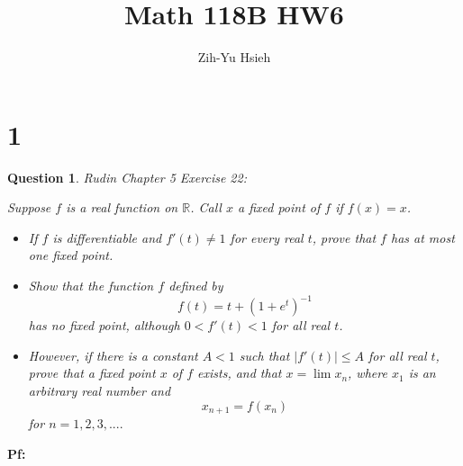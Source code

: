 \documentclass{article}
\title{Math 118B HW6}
\author{Zih-Yu Hsieh}
\newtheorem{question}{Question}
\begin{document}
\maketitle

\section*{1}
\begin{myBox}[]{}
    \begin{question}
        Rudin Chapter 5 Exercise 22:

        Suppose $f$ is a real function on $\mathbb{R}$. Call $x$ a \textit{fixed point} of $f$ if $f(x)=x$.
        \begin{itemize}
            \item[(a)] If $f$ is differentiable and $f'(t)\neq 1$ for every real $t$, prove that $f$ has at most one fixed point.
            \item[(b)] Show that the function $f$ defined by 
            $$f(t)=t+(1+e^t)^{-1}$$
            has no fixed point, although $0<f'(t)<1$ for all real $t$.
            \item[(c)] However, if there is a constant $A<1$ such that $|f'(t)|\leq A$ for all real $t$, prove that a fixed point $x$ of $f$ exists,
            and that $x=\lim x_n$, where $x_1$ is an arbitrary real number and
            $$x_{n+1}=f(x_n)$$
            for $n=1,2,3,....$
        \end{itemize}
    \end{question}
\end{myBox}

\textbf{Pf:}
\end{document}
